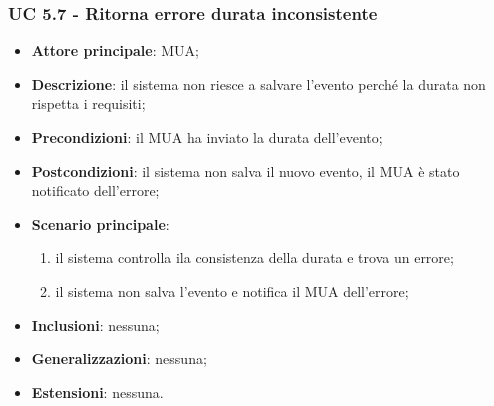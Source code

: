     \subsubsection{UC 5.7 - Ritorna errore durata inconsistente} \label{sec:UC5.7}
    \begin{itemize}
        \item \textbf{Attore principale}: MUA;
        \item \textbf{Descrizione}: il sistema non riesce a salvare l'evento perché la durata non rispetta i requisiti;
        \item \textbf{Precondizioni}: il MUA ha inviato la durata dell'evento;
        \item \textbf{Postcondizioni}: il sistema non salva il nuovo evento, il MUA è stato notificato dell'errore;
        \item \textbf{Scenario principale}:
            \begin{enumerate}
                \item il sistema controlla ila consistenza della durata e trova un errore;
                \item il sistema non salva l'evento e notifica il MUA dell'errore;
            \end{enumerate}
        \item \textbf{Inclusioni}: nessuna;
        \item \textbf{Generalizzazioni}: nessuna;
        \item \textbf{Estensioni}: nessuna.
    \end{itemize}